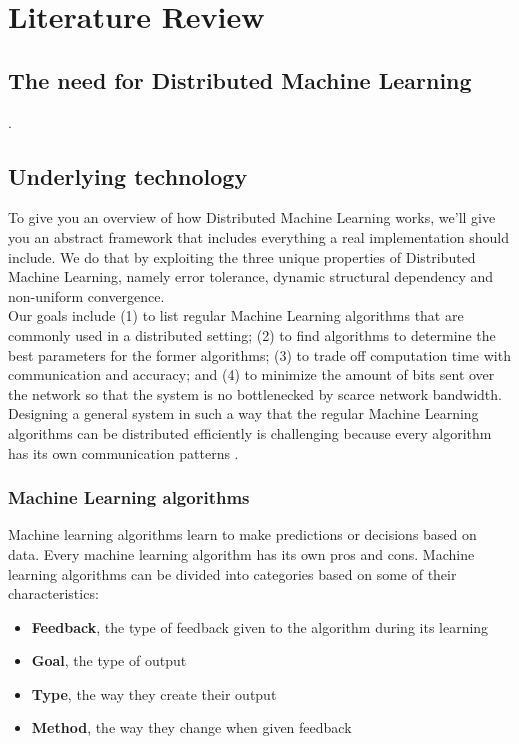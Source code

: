 \section{Literature Review}

\subsection{The need for Distributed Machine Learning}
.









\subsection{Underlying technology}
To give you an overview of how Distributed Machine Learning works, we'll give you an abstract framework that includes everything a real implementation should include. We do that by exploiting the three unique properties of Distributed Machine Learning, namely error tolerance, dynamic structural dependency and non-uniform convergence.\cite{Xing16}\\
Our goals include (1) to list regular Machine Learning algorithms that are commonly used in a distributed setting; (2) to find algorithms to determine the best parameters for the former algorithms; (3) to trade off computation time with communication and accuracy; and (4) to minimize the amount of bits sent over the network so that the system is no bottlenecked by scarce network bandwidth.\\
Designing a general system in such a way that the regular Machine Learning algorithms can be distributed efficiently is challenging because every algorithm has its own communication patterns \cite{Jia14}\cite{Newman09}\cite{Rich13}\cite{Smola10}\cite{Takac13}\cite{Tsi12}.

\subsubsection{Machine Learning algorithms}
Machine learning algorithms learn to make predictions or decisions based on data. Every machine learning algorithm has its own pros and cons. Machine learning algorithms can be divided into categories based on some of their characteristics:
\begin{itemize}
	\item \textbf{Feedback}, the type of feedback given to the algorithm during its learning
	\item \textbf{Goal}, the type of output
	\item \textbf{Type}, the way they create their output
	\item \textbf{Method}, the way they change when given feedback
\end{itemize}

